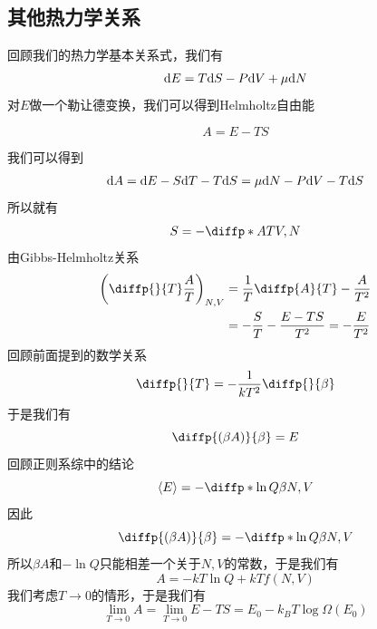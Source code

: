 \subsection{其他热力学关系} %
\label{sub:其他热力学关系}
回顾我们的热力学基本关系式，我们有\begin{equation}
       \mathrm{d} E =T \mathrm{d} S -P \mathrm{d} V +\mu \mathrm{d} N
\end{equation}
对$E$做一个勒让德变换，我们可以得到Helmholtz自由能\begin{definition}[Helmholtz自由能]
       \begin{equation}
              A=E-TS
       \end{equation}
\end{definition}
我们可以得到\begin{equation}
       \mathrm{d} A =\mathrm{d} E -S\mathrm{d} T-T \mathrm{d} S =\mu \mathrm{d} N -P \mathrm{d} V -T \mathrm{d} S
\end{equation}
所以就有\begin{equation}
       S=-\diffp*{A}{T}{V,N}
\end{equation}
由Gibbs-Helmholtz关系\begin{equation}
\begin{aligned}
       \left(\diffp{}{T} \frac{A}{T}\right)_{N,V}&=\frac{1}{T}\diffp{A}{T}-\frac{A}{T^2}       \\
       &=-\frac{S}{T}-\frac{E-TS}{T^2}=-\frac{E}{T^2}
\end{aligned}\end{equation}
回顾前面提到的数学关系\begin{equation}
       \diffp{}{T}=-\frac{1}{kT^2} \diffp{}{\beta}
\end{equation}
于是我们有\begin{equation}
       \diffp{{(\beta A)}}{\beta} =E 
\end{equation}
回顾正则系综中的结论\begin{equation}
       \braket{E}=-\diffp*{\ln Q}{\beta}{N,V}
\end{equation}
因此\begin{equation}
       \diffp{{(\beta A)}}{\beta}=-\diffp*{\ln Q}{\beta}{N,V}
\end{equation}
所以$\beta A$和$-\ln Q$只能相差一个关于$N,V$的常数，于是我们有\begin{equation}
       A=-kT\ln Q +kT f(N,V)
\end{equation}
我们考虑$T\to 0$的情形，于是我们有\begin{equation}
      \lim_{T\to 0} A=\lim_{T\to 0} E-TS=E_0 -k_B T\log \Omega(E_0)
\end{equation}
